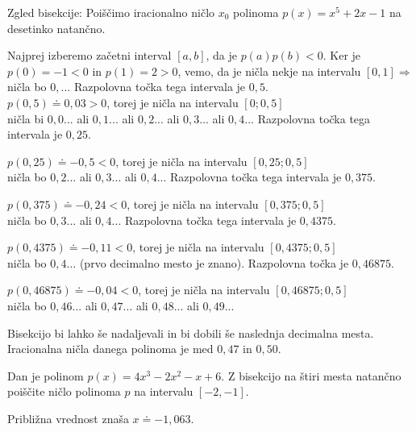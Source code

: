 \begin{vaja}

Zgled bisekcije:
Poiščimo iracionalno ničlo $x_0$ polinoma $p(x)=x^5+2x-1$ na desetinko natančno.

Najprej izberemo začetni interval $[a,b]$, da je $p(a)p(b)<0$. Ker je $p(0)=-1<0$ in $p(1)=2>0$, 
vemo, da je ničla nekje na intervalu $[0,1] \Rightarrow$ \\
ničla bo $0,...$ Razpolovna točka tega intervala je $0,5$. \\
$p(0,5)\doteq 0,03>0$, torej je ničla na intervalu $[0;0,5]$ \Rightarrow \\

ničla bi $0,0...$ ali $0,1...$ ali $0,2...$ ali $0,3...$ ali $0,4...$ Razpolovna točka tega intervala je $0,25$.

$p(0,25)\doteq-0,5<0$, torej je ničla na intervalu $[0,25;0,5]$ \Rightarrow \\
ničla bo $0,2...$ ali $0,3...$ ali $0,4...$ Razpolovna točka tega intervala je $0,375$.

$p(0,375)\doteq -0,24<0$, torej je ničla na intervalu $[0,375;0,5]$ \Rightarrow \\
ničla bo $0,3...$ ali $0,4...$ Razpolovna točka tega intervala je $0,4375$.

$p(0,4375)\doteq -0,11<0$, torej je ničla na intervalu $[0,4375;0,5]$ \Rightarrow \\
ničla bo $0,4...$ (prvo decimalno mesto je znano). Razpolovna točka je $0,46875$.

$p(0,46875)\doteq -0,04<0$, torej je ničla na intervalu $[0,46875;0,5]$ \Rightarrow \\
ničla bo $0,46...$ ali $0,47...$ ali $0,48...$ ali $0,49$...

Bisekcijo bi lahko še nadaljevali in bi dobili še naslednja decimalna mesta.
Iracionalna ničla danega polinoma je med $0,47$ in $0,50$.



\end{vaja}

\begin{vaja}
Dan je polinom $p(x)=4x^3-2x^2-x+6$. Z bisekcijo na štiri mesta natančno poiščite ničlo
polinoma $p$ na intervalu $[-2,-1]$.


\begin{odgovor}
Približna vrednost znaša $x\doteq -1,063$.
\end{odgovor}

\end{vaja}









